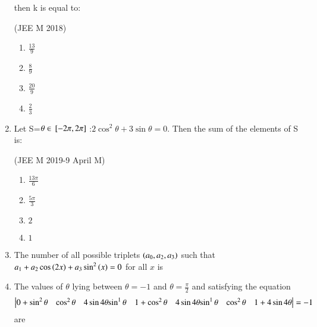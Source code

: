 \begin{enumerate}[label=\thesubsection.\arabic*,ref=\thesubsection.\theenumi]
 then k is equal to:
 
\hfill{(JEE M 2018)}
\begin{enumerate}
\item $\frac{13}{9}$
\item $\frac{8}{9}$
\item  $\frac{20}{9}$
\item  $\frac{2}{3}$
\end{enumerate}
\item Let S=$\theta \in {}\left[-2\pi, 2\pi\right]$ :$2\cos^2\theta + 3\sin\theta=0.$
 Then the sum of the elements of S is:
 
\hfill {(JEE M 2019-9 April M)}
\begin{enumerate}
\item $\frac{13\pi}{6}$ 
\item $\frac{5\pi}{3}$
 \item $2$
 \item $1$
\end{enumerate} 
\item The number of all possible triplets $\left(a_0, a_2, a_3\right)$ such that $a_1 + a_2 \cos\left(2x\right) + a_3\sin^2\left(x\right) = 0$ for all $x$ is
\hfill{}
\begin{enumerate}
\end{enumerate}
\item The values of $\theta$ lying between $\theta = -1$ and $\theta = \frac{\pi}{2}$ and satisfying the equation
\[\begin{vmatrix}
$$0+\sin^2\theta$$ & $$\cos^2\theta$$ & $$4\sin4\theta$$
$$\sin^1\theta$$ & $$1+\cos^2\theta$$ & $$4\sin4\theta$$
$$\sin^1\theta$$ & $$\cos^2\theta$$ & $$1+4\sin4\theta$$
\end{vmatrix} = -1\] are
\hfill{}
\begin{enumerate}
\end{enumerate}
\end{enumerate}
